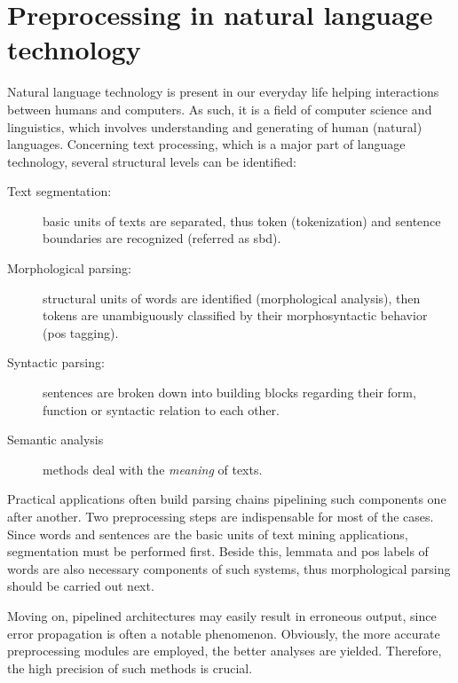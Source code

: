 \section{Preprocessing in natural language technology}



Natural language technology is present in our everyday life helping interactions between humans and computers.
As such, it is a field of computer science and linguistics, which involves understanding and generating of human (natural) languages.
Concerning text processing, which is a major part of language technology, several structural levels can be identified:
\begin{description}
\item[Text segmentation:] basic units of texts are separated, thus token (tokenization) and sentence boundaries are recognized (referred as \gls{sbd}).
\item[Morphological parsing:] structural units of words are identified (morphological analysis), then tokens are unambiguously classified by their morphosyntactic behavior (\acrlong{pos} tagging).
\item[Syntactic parsing:] sentences are broken down into building blocks regarding their form, function or syntactic relation to each other.
\item[Semantic analysis] methods deal with the \emph{meaning} of texts.
\end{description}

Practical applications often build parsing chains pipelining such components one after another. 
Two preprocessing steps are indispensable for most of the cases.
Since words and sentences are the basic units of text mining applications, segmentation must be performed first.
Beside this, lemmata and \gls{pos} labels of words are also necessary components of such systems, thus morphological parsing should be carried out next.

Moving on, pipelined architectures may easily result in erroneous output, since error propagation is often a notable phenomenon. 
Obviously, the more accurate preprocessing modules are employed, the better analyses are yielded. Therefore, the high precision of such methods is crucial.

